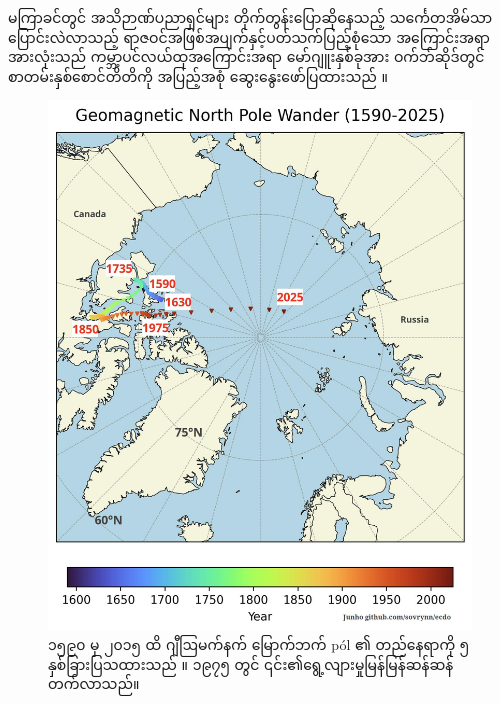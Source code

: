 \documentclass[10pt,twocolumn,letterpaper]{article}
\begin{document}
\begin{flushleft}
\begin{enumerate}
{မကြာခင်တွင် အသိဉာဏ်ပညာရှင်များ တိုက်တွန်းပြောဆိုနေသည့် သင်္ကေတအိမ်သာပြောင်းလဲလာသည့် ရာဇဝင်အဖြစ်အပျက်နှင့်ပတ်သက်ပြည့်စုံသော အကြောင်းအရာအားလုံးသည် ကမ္ဘာ့ပင်လယ်ထုအကြောင်းအရာ မော်ဂျူးနှစ်ခုအား ဝက်ဘ်ဆိုဒ်တွင် စာတမ်းနှစ်စောင်တိတိကို အပြည့်အစုံ ဆွေးနွေးဖော်ပြထားသည် \cite{3}။

\begin{figure}[t]
\begin{center}
   \includegraphics[width=1\linewidth]{npw.jpg}
\end{center}
   \caption{၁၅၉၀ မှ ၂၀၁၅ ထိ ဂျီဩမက်နက် မြောက်ဘက် pól ၏ တည်နေရာကို ၅ နှစ်ခြားပြသထားသည် \cite{41}။ ၁၉၇၅ တွင် ၎င်း၏ရွေ့လျားမှုမြန်မြန်ဆန်ဆန်တက်လာသည်။}
\label{fig:13}
\label{fig:onecol}
\end{figure}

}
\end{enumerate}
\end{flushleft}
\end{document}

